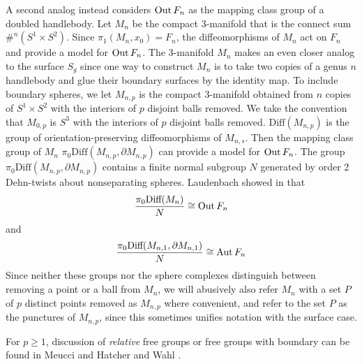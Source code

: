 A second analog instead considers $\operatorname{Out} F_n$
as the mapping class group of a doubled handlebody.
Let $M_{n}$ be the compact 3-manifold
that is the connect sum  $\#^n \left (S^1 \times S^2 \right )$.
Since $\pi_1(M_{n},x_0) = F_n$,
the diffeomorphisms of $M_n$ act on $F_n$ and provide a model for $\operatorname{Out} F_n$.
The 3-manifold $M_n$ makes an even closer analog to the surface $S_g$
since one way to construct $M_n$ is to take two copies of a genus $n$ handlebody and glue their boundary surfaces by the identity map.
To include boundary spheres, we let $M_{n,p}$ is the compact 3-manifold obtained
from $n$ copies of $S^1 \times S^2$ with
the interiors of $p$ disjoint balls removed.
We take the convention that $M_{0,p}$ is $S^3$ with the interiors of $p$ disjoint balls removed.
$\mbox{Diff}(M_{n,p})$ is the group of orientation-preserving diffeomorphisms of $M_{n,s}$.
Then the mapping class group of $M_n$
$\pi_0 \mbox{Diff}(M_{n,p}, \partial M_{n,p})$
can provide a model for $\operatorname{Out} F_n$.
The group $\pi_0 \mbox{Diff}(M_{n,p}, \partial M_{n,p})$
contains a finite normal subgroup $N$ generated by order 2 Dehn-twists about nonseparating spheres.
Laudenbach showed in \cite{MR0314054} that
$$
\frac{\pi_0 \mbox{Diff}(M_n)} N \cong \operatorname{Out} F_n
$$
and
$$
\frac{\pi_0 \mbox{Diff}(M_{n,1} ,\partial M_{n,1} )} N \cong \operatorname{Aut} F_n
$$
Since neither these groups nor the sphere complexes distinguish between removing a point or a ball from $M_n$,
we will abusively
also refer $M_n$ with a set $P$ of $p$ distinct points removed as $M_{n,p}$ where convenient,
and refer to the set $P$ as the punctures of $M_{n,p}$, since this sometimes unifies notation with the surface case.

For $p\geq 1$, discussion of \emph{relative} free groups or free groups with boundary can be found in Meucci \cite{MR2982242} and
Hatcher and Wahl \cite{MR2174267}.


